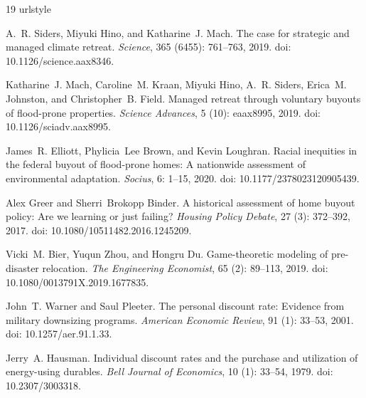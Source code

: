 \documentclass[11pt,letterpaper]{article}
\theoremstyle{definition}
\begin{document}
\begin{thebibliography}{19}
\providecommand{\natexlab}[1]{#1}
\providecommand{\url}[1]{\texttt{#1}}
\expandafter\ifx\csname urlstyle\endcsname\relax
  \providecommand{\doi}[1]{doi: #1}\else
  \providecommand{\doi}{doi: \begingroup \urlstyle{rm}\Url}\fi

A.~R. Siders, Miyuki Hino, and Katharine~J. Mach.
\newblock The case for strategic and managed climate retreat.
\newblock \emph{Science}, 365 (6455): 761--763, 2019.
\newblock \doi{10.1126/science.aax8346}.

Katharine~J. Mach, Caroline~M. Kraan, Miyuki Hino, A.~R. Siders, Erica~M.
  Johnston, and Christopher~B. Field.
\newblock Managed retreat through voluntary buyouts of flood-prone properties.
\newblock \emph{Science Advances}, 5 (10): eaax8995, 2019.
\newblock \doi{10.1126/sciadv.aax8995}.

James~R. Elliott, Phylicia~Lee Brown, and Kevin Loughran.
\newblock Racial inequities in the federal buyout of flood-prone homes: A
  nationwide assessment of environmental adaptation.
\newblock \emph{Socius}, 6: 1--15, 2020.
\newblock \doi{10.1177/2378023120905439}.

Alex Greer and Sherri~Brokopp Binder.
\newblock A historical assessment of home buyout policy: Are we learning or
  just failing?
\newblock \emph{Housing Policy Debate}, 27 (3): 372--392,
  2017.
\newblock \doi{10.1080/10511482.2016.1245209}.

Vicki~M. Bier, Yuqun Zhou, and Hongru Du.
\newblock Game-theoretic modeling of pre-disaster relocation.
\newblock \emph{The Engineering Economist}, 65 (2): 89--113,
  2019.
\newblock \doi{10.1080/0013791X.2019.1677835}.

John~T. Warner and Saul Pleeter.
\newblock The personal discount rate: Evidence from military downsizing
  programs.
\newblock \emph{American Economic Review}, 91 (1): 33--53,
  2001.
\newblock \doi{10.1257/aer.91.1.33}.

Jerry~A. Hausman.
\newblock Individual discount rates and the purchase and utilization of
  energy-using durables.
\newblock \emph{Bell Journal of Economics}, 10 (1): 33--54,
  1979.
\newblock \doi{10.2307/3003318}.


\end{thebibliography}
\end{document}
